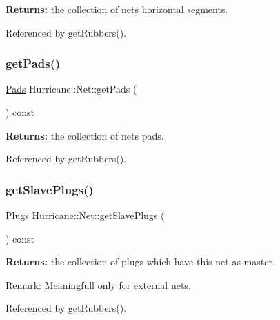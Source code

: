 {\bfseries Returns\+:} the collection of net\textquotesingle{}s horizontal segments. 

Referenced by get\+Rubbers().

\mbox{\label{classHurricane_1_1Net_a564df07be5589bc72dd6eb944855aa2b}} 
\subsubsection{\texorpdfstring{get\+Pads()}{getPads()}}
{\footnotesize\ttfamily \hyperlink{namespaceHurricane_abd1f433c44d8b515e1b8a8810aea1610}{Pads} Hurricane\+::\+Net\+::get\+Pads (\begin{DoxyParamCaption}{ }\end{DoxyParamCaption}) const}

{\bfseries Returns\+:} the collection of net\textquotesingle{}s pads. 

Referenced by get\+Rubbers().

\mbox{\label{classHurricane_1_1Net_a9c835d2f071155521700921d816ac1fa}} 
\subsubsection{\texorpdfstring{get\+Slave\+Plugs()}{getSlavePlugs()}}
{\footnotesize\ttfamily \hyperlink{namespaceHurricane_ac8335d2057483ee7a935c15a9460c64f}{Plugs} Hurricane\+::\+Net\+::get\+Slave\+Plugs (\begin{DoxyParamCaption}{ }\end{DoxyParamCaption}) const}

{\bfseries Returns\+:} the collection of plugs which have this net as master.

\begin{DoxyParagraph}{Remark\+:}
Meaningfull only for external nets. 
\end{DoxyParagraph}


Referenced by get\+Rubbers().

\mbox{\label{classHurricane_1_1Net_a08560ffa6b0f5ecc442bf232486dd8ff}} 
